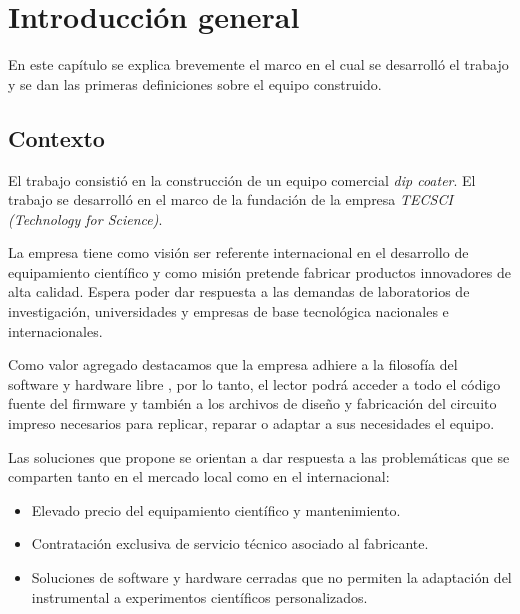 
\chapter{Introducción general} %

\label{Chapter1} %


En este capítulo se explica brevemente el marco en el cual se desarrolló el trabajo y se dan las primeras definiciones sobre el equipo construido. 
\section{Contexto}

El trabajo consistió en la construcción de un equipo comercial \textit{dip coater}. El trabajo se desarrolló en el marco de la fundación de la empresa \textit{TECSCI (Technology for Science)}.

La empresa tiene como visión ser referente internacional en el desarrollo de equipamiento científico y como misión pretende fabricar productos innovadores de alta calidad. Espera poder dar respuesta a las demandas de laboratorios de investigación, universidades y empresas de base tecnológica nacionales e internacionales.

Como valor agregado destacamos que la empresa adhiere a la filosofía del software y hardware libre \citep{web_oshwa}, por lo tanto, el lector podrá acceder a todo el código fuente del firmware \citep{web_firmware_tecsci} y también a los archivos de diseño y fabricación del circuito impreso \citep{web_hardware_tecsci} necesarios para replicar, reparar o adaptar a sus necesidades el equipo.

Las soluciones que propone se orientan a dar respuesta a las problemáticas que se comparten tanto en el mercado local como en el internacional:
\begin{itemize}
\item Elevado precio del equipamiento científico y mantenimiento.
\item Contratación exclusiva de servicio técnico asociado al fabricante.
\item Soluciones de software y hardware cerradas que no permiten la adaptación del instrumental a experimentos científicos personalizados.
\end{itemize}


